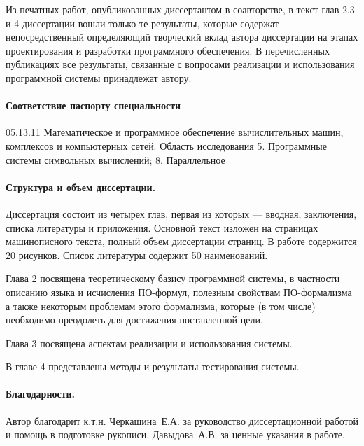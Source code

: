 Из печатных работ, опубликованных диссертантом в соавторстве, в текст глав 2,3 и 4 диссертации вошли только те результаты, которые содержат непосредственный определяющий творческий вклад автора диссертации на этапах проектирования и разработки программного обеспечения. В перечисленных публикациях все результаты, связанные с вопросами реализации и использования программной системы принадлежат автору.

\paragraph{Соответствие паспорту специальности}
05.13.11 Математическое и программное обеспечение вычислительных машин, комплексов и компьютерных сетей. Область исследования 5. Программные системы символьных вычислений; 8. Параллельное


\paragraph{Структура и объем диссертации.} Диссертация состоит из четырех глав, первая из которых --- вводная, заключения, списка литературы и приложения. Основной текст изложен на \pageref{pg:main} страницах машинописного текста, полный объем диссертации \pageref{pg:total} страниц. В работе содержится 20 рисунков. Список литературы содержит 50 наименований.

Глава 2 посвящена теоретическому базису программной системы, в частности описанию языка и исчисления ПО-формул, полезным свойствам ПО-формализма а также некоторым проблемам этого формализма, которые (в том числе) необходимо преодолеть для достижения поставленной цели.

Глава 3 посвящена аспектам реализации и использования системы.

В главе 4 представлены методы и результаты тестирования системы. 

\paragraph{Благодарности.} Автор благодарит к.т.н. Черкашина~Е.А. за руководство диссертационной работой и помощь в подготовке рукописи, Давыдова~А.В. за ценные указания в работе.



